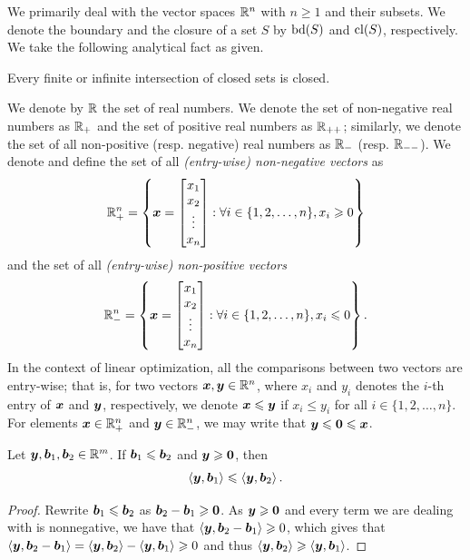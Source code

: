 
%

We primarily deal with the vector spaces $\mathbb R^n$ with $n\geq 1$ and their subsets. We denote the boundary and the closure of a set $S$ by $\operatorname{bd}(S)$ and $\operatorname{cl}(S)$, respectively. We take the following analytical fact as given.
\begin{proposition}\label{prop: closed intersection}
Every finite or infinite intersection of closed sets is closed. \hfill\qedsymbol
\end{proposition}


We denote by $\mathbb R$ the set of real numbers. We denote the set of non-negative real numbers as $\mathbb R_+$ and the set of positive real numbers as $\mathbb R_{++}$; similarly, we denote the set of all non-positive (resp. negative) real numbers as $\mathbb R_-$ (resp. $\mathbb R_{--}$). We denote and define the set of all {\em (entry-wise) non-negative vectors} as 
$$\mathbb R^n_+  = \left\{{\boldsymbol x} = \begin{bmatrix}x_1\\ x_2\\ \vdots\\ x_n\end{bmatrix}: \forall i\in\{1,2,\dots, n\}, x_i\geqslant 0\right\}$$ 
and the set of all {\em (entry-wise) non-positive vectors} $$\mathbb R^n_-  = \left\{{\boldsymbol x} = \begin{bmatrix}x_1\\ x_2\\ \vdots\\ x_n\end{bmatrix}: \forall i\in\{1,2,\dots, n\}, x_i\leqslant 0\right\}. $$
In the context of linear optimization, all the comparisons between two vectors are entry-wise; that is, for two vectors ${\boldsymbol x}, {\boldsymbol y} \in\mathbb R^n$, where $x_i$ and  $y_i$ denotes the $i$-th entry of ${\boldsymbol x}$ and ${\boldsymbol y}$, respectively, we denote ${\boldsymbol x}\leqslant{\boldsymbol y}$ if $x_i \leq y_i$ for all $i\in\{1,2,\dots, n\}$. For elements ${\boldsymbol x}\in\mathbb R^n_+$ and ${\boldsymbol y} \in\mathbb R^n_-$, we may write that ${\boldsymbol y}\leqslant \boldsymbol0\leqslant{\boldsymbol x}$.  

\begin{proposition}
Let ${\boldsymbol y}, {\boldsymbol b}_1, {\boldsymbol b}_2 \in\mathbb R^m$. If ${\boldsymbol b}_1 \leqslant {\boldsymbol b}_2$ and ${\boldsymbol y}\geqslant \boldsymbol0$, then 
$$\left\langle{\boldsymbol y}, {\boldsymbol b}_1\right\rangle\leqslant \left\langle{\boldsymbol y}, {\boldsymbol b}_2\right\rangle.$$
\end{proposition}
\begin{proof}
Rewrite ${\boldsymbol b}_1 \leqslant {\boldsymbol b}_2$ as ${\boldsymbol b}_2 - {\boldsymbol b}_1 \geqslant \boldsymbol0$. As ${\boldsymbol y}\geqslant \boldsymbol0$ and every term we are dealing with is nonnegative, we have that $\left\langle{\boldsymbol y}, {\boldsymbol b}_2 - {\boldsymbol b}_1\right\rangle \geqslant 0$, which gives that $ \left\langle{\boldsymbol y}, {\boldsymbol b}_2 - {\boldsymbol b}_1\right\rangle  = \left\langle{\boldsymbol y}, {\boldsymbol b}_2\right\rangle - \left\langle{\boldsymbol y}, {\boldsymbol b}_1\right\rangle \geqslant 0 $ and thus $\left\langle{\boldsymbol y}, {\boldsymbol b}_2\right\rangle \geqslant \left\langle{\boldsymbol y}, {\boldsymbol b}_1\right\rangle$. 
\end{proof}

